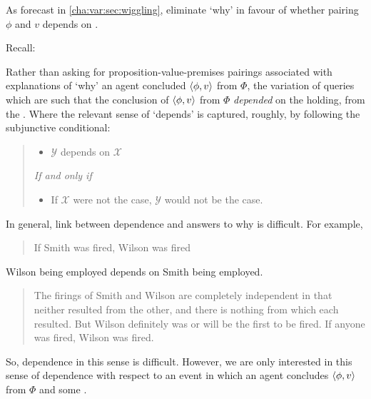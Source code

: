 \begin{note}
  As forecast in \autoref{cha:var:sec:wiggling}, eliminate `why' in favour of whether pairing \(\phi\) and \(v\) depends on \ros{}.

  Recall:
  \begin{quote}%
    \vspace{-1.5\baselineskip}%
    \questionWhyBasic*
  \end{quote}

  Rather than asking for proposition-value-premises pairings associated with explanations of `why' an agent concluded \(\langle \phi, v \rangle\) from \(\Phi\), the variation of \qWhy{} queries which  are such that the conclusion of \(\langle \phi, v \rangle\) from \(\Phi\) \emph{depended} on the  holding, from the \agpe{}.
  Where the relevant sense of `depends' is captured, roughly, by following the subjunctive conditional:

  \begin{quote}
    \begin{itemize}
    \item
      \(\mathcal{Y}\) depends on \(\mathcal{X}\)
    \end{itemize}
    \emph{If and only if}
    \begin{itemize}
    \item
      If \(\mathcal{X}\) were not the case, \(\mathcal{Y}\) would not be the case.
    \end{itemize}
  \end{quote}

  In general, link between dependence and answers to why is difficult.
  For example,

  \begin{quote}
    If Smith was fired, Wilson was fired
  \end{quote}
  Wilson being employed depends on Smith being employed.

  \begin{quote}
    The firings of Smith and Wilson are completely independent in that neither resulted from the other, and there is nothing from which each resulted. But Wilson definitely was or will be the first to be fired. If anyone was fired, Wilson was fired.
  \end{quote}

  So, dependence in this sense is difficult.
  However, we are only interested in this sense of dependence with respect to an event in which an agent concludes \(\langle \phi, v \rangle\) from \(\Phi\) and some \ros{}.


\end{note}

